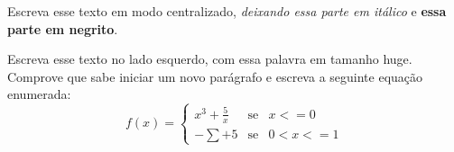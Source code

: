 \documentclass[11pt]{report}
\begin{document}
	\thispagestyle{empty}

	\begin{center}
	Escreva esse texto em modo centralizado, \textit{deixando essa parte em itálico} e \textbf{essa parte em negrito}.
	\end{center}
	
	\hspace*{\fill}Escreva esse texto no lado esquerdo, com essa {\huge palavra} em tamanho huge. \\
	
    Comprove que sabe iniciar um novo parágrafo e escreva a seguinte equação enumerada:
	$$
	f(x)=
	\left 
		\{
			\begin{array}{ccl}
				x^3 + \frac{5}{x} & \mbox {se} & x <= 0 \\
				-\sum + 5 & \mbox{se} & 0 < x <= 1
			\end{array}
	\right.
	$$
	
\end{document}
